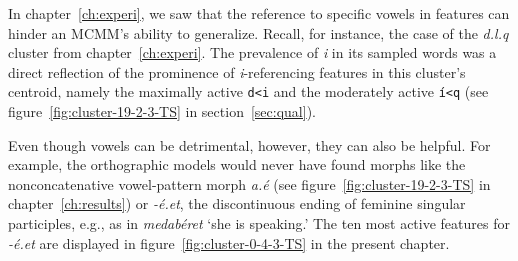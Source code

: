 In chapter~\ref{ch:experi}, we saw that the reference to specific vowels in features can 
hinder an MCMM's ability to generalize. Recall, for instance, the case of the \textit{d.l.q} 
cluster from chapter~\ref{ch:experi}. The prevalence 
of \textit{i} in its sampled words was a direct reflection of the prominence of 
\textit{i}-referencing features in this cluster's centroid, namely the maximally 
active \texttt{d<i} and the moderately active \texttt{\'{i}<q} (see figure~\ref{fig:cluster-19-2-3-TS} in section~\ref{sec:qual}).

Even though vowels can be detrimental, however, they can also be helpful. For example, the orthographic models would never have found morphs like the nonconcatenative vowel-pattern morph \textit{a.\'{e}} (see figure~\ref{fig:cluster-19-2-3-TS} in chapter~\ref{ch:results}) or \textit{-\'{e}.et}, the discontinuous ending of  feminine singular participles, e.g., as in \textit{medab\'{e}ret} `she is speaking.' The ten most active features for \textit{-\'{e}.et} are displayed in figure~\ref{fig:cluster-0-4-3-TS} in the present chapter.

